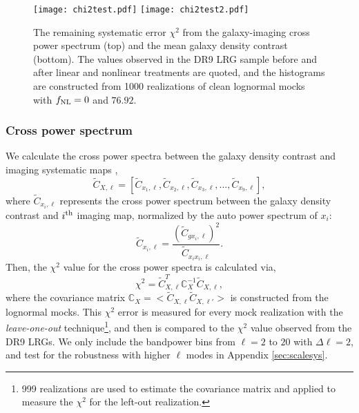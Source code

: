 \begin{figure}
\raggedleft
\texttt{[image: chi2test.pdf]}
\texttt{[image: chi2test2.pdf]}
\caption{The remaining systematic error $\chi^{2}$ from the galaxy-imaging cross power spectrum (top) and the mean galaxy density contrast (bottom). The values observed in the DR9 LRG sample before and after linear and nonlinear treatments are quoted, and the histograms are constructed from 1000 realizations of clean lognormal mocks with $f_{\rm NL}=0$ and $76.92$. }\label{fig:chi2test}
\end{figure}


\subsubsection{Cross power spectrum}

We calculate the cross power spectra between the galaxy density contrast and imaging systematic maps ,
\begin{equation}
\tilde{C}_{X, \ell} = [\tilde{C}_{x_{1}, \ell}, \tilde{C}_{x_{2}, \ell}, \tilde{C}_{x_{3}, \ell}, ..., \tilde{C}_{x_{9}, \ell}],
\end{equation}
where $\tilde{C}_{x_{i}, \ell}$ represents the cross power spectrum between the galaxy density contrast and $i^{\rm th}$ imaging map, normalized by the auto power spectrum of $x_{i}$:
\begin{equation}
\tilde{C}_{x_{i}, \ell} = \frac{(\tilde{C}_{gx_{i}, \ell})^{2}}{\tilde{C}_{x_{i}x_{i},\ell}}.
\end{equation}
Then, the $\chi^{2}$ value for the cross power spectra is calculated via,
\begin{equation}
\chi^{2} = \tilde{C}^{T}_{X, \ell} \mathbb{C}_{X}^{-1} \tilde{C}_{X, \ell},
\end{equation}
where the covariance matrix $\mathbb{C}_{X} = < \tilde{C}_{X, \ell} \tilde{C}_{X, \ell'} >$ is constructed from the lognormal mocks. This $\chi^{2}$ error is measured for every mock realization with the \textit{leave-one-out} technique\footnote{999 realizations are used to estimate the covariance matrix and applied to measure the $\chi^{2}$ for the left-out realization.}, and then is compared to the $\chi^{2}$ value observed from the DR9 LRGs. We only include the bandpower bins from $\ell=2$ to $20$ with $\Delta\ell=2$, and test for the robustness with higher $\ell$ modes in Appendix \ref{sec:scalesys}. 

